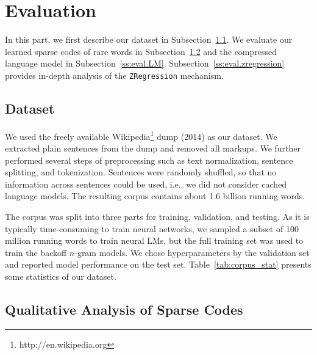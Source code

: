 \documentclass[11pt]{article}
\begin{document}
\section{Evaluation}\label{sec:experiment}
In this part, we first describe our dataset in Subsection~\ref{ss:dataset}.
We evaluate our learned sparse codes of rare words in Subsection~\ref{ss:eval.code} and the compressed language model in Subsection~\ref{ss:eval.LM}. Subsection~\ref{ss:eval.zregression} provides in-depth analysis of the \texttt{ZRegression} mechanism.

\subsection{Dataset}\label{ss:dataset}

We used the freely available Wikipedia\footnote{http://en.wikipedia.org} dump (2014) as our dataset.
We extracted  plain sentences from the dump and removed all markups.
We further performed several steps of preprocessing
such as text normalization, sentence splitting, and tokenization.
Sentences were randomly shuffled,
so that no information across sentences could be used, i.e., we did not consider cached language models. The resulting corpus contains about 1.6 billion running words.

The corpus was split into three parts for training, validation, and testing.
As it is typically time-consuming to train neural networks,
we sampled a subset of 100 million running words to train neural LMs,
but the full training set was used to train the backoff $n$-gram models.
We chose hyperparameters by the validation set and reported model performance on the test set.
Table~\ref{tab:corpus_stat} presents some statistics of our dataset.



\subsection{Qualitative Analysis of Sparse Codes}\label{ss:eval.code}
\end{document}
